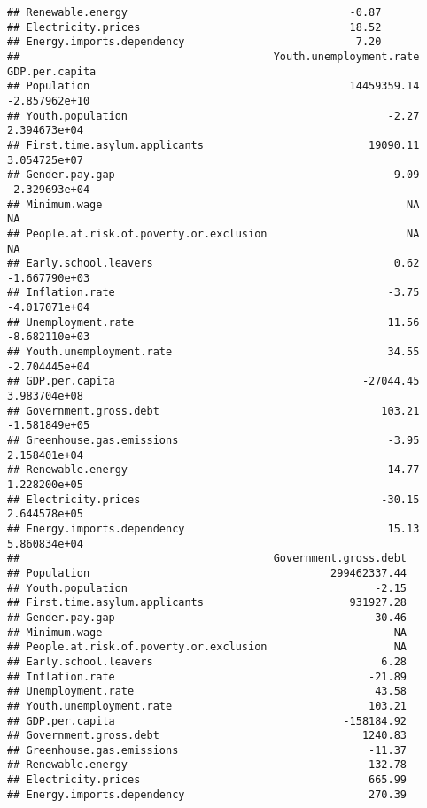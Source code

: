 \documentclass[
]{article}
\begin{document}
\begin{verbatim}
## Renewable.energy                                   -0.87
## Electricity.prices                                 18.52
## Energy.imports.dependency                           7.20
##                                        Youth.unemployment.rate GDP.per.capita
## Population                                         14459359.14  -2.857962e+10
## Youth.population                                         -2.27   2.394673e+04
## First.time.asylum.applicants                          19090.11   3.054725e+07
## Gender.pay.gap                                           -9.09  -2.329693e+04
## Minimum.wage                                                NA             NA
## People.at.risk.of.poverty.or.exclusion                      NA             NA
## Early.school.leavers                                      0.62  -1.667790e+03
## Inflation.rate                                           -3.75  -4.017071e+04
## Unemployment.rate                                        11.56  -8.682110e+03
## Youth.unemployment.rate                                  34.55  -2.704445e+04
## GDP.per.capita                                       -27044.45   3.983704e+08
## Government.gross.debt                                   103.21  -1.581849e+05
## Greenhouse.gas.emissions                                 -3.95   2.158401e+04
## Renewable.energy                                        -14.77   1.228200e+05
## Electricity.prices                                      -30.15   2.644578e+05
## Energy.imports.dependency                                15.13   5.860834e+04
##                                        Government.gross.debt
## Population                                      299462337.44
## Youth.population                                       -2.15
## First.time.asylum.applicants                       931927.28
## Gender.pay.gap                                        -30.46
## Minimum.wage                                              NA
## People.at.risk.of.poverty.or.exclusion                    NA
## Early.school.leavers                                    6.28
## Inflation.rate                                        -21.89
## Unemployment.rate                                      43.58
## Youth.unemployment.rate                               103.21
## GDP.per.capita                                    -158184.92
## Government.gross.debt                                1240.83
## Greenhouse.gas.emissions                              -11.37
## Renewable.energy                                     -132.78
## Electricity.prices                                    665.99
## Energy.imports.dependency                             270.39

\end{verbatim}
\end{document}

